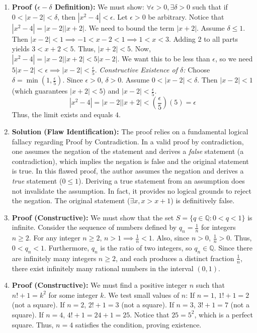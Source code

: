 \documentclass[11pt]{article}
\begin{document}
\begin{enumerate}
    \item \textbf{Proof ($\epsilon-\delta$ Definition):} We must show: $\forall \epsilon > 0, \exists \delta > 0$ such that if $0 < |x - 2| < \delta$, then $|x^2 - 4| < \epsilon$.
    Let $\epsilon > 0$ be arbitrary. Notice that $|x^2 - 4| = |x - 2||x + 2|$. We need to bound the term $|x + 2|$. 
    Assume $\delta \le 1$. Then $|x - 2| < 1 \implies -1 < x - 2 < 1 \implies 1 < x < 3$. 
    Adding $2$ to all parts yields $3 < x + 2 < 5$. Thus, $|x + 2| < 5$.
    Now, $|x^2 - 4| = |x - 2||x + 2| < 5|x - 2|$. We want this to be less than $\epsilon$, so we need $5|x - 2| < \epsilon \implies |x - 2| < \frac{\epsilon}{5}$.
    \textit{Constructive Existence of $\delta$:} Choose $\delta = \min(1, \frac{\epsilon}{5})$. Since $\epsilon > 0$, $\delta > 0$.
    Assume $0 < |x - 2| < \delta$. Then $|x - 2| < 1$ (which guarantees $|x + 2| < 5$) and $|x - 2| < \frac{\epsilon}{5}$.
    \[ |x^2 - 4| = |x - 2||x + 2| < \left(\frac{\epsilon}{5}\right)(5) = \epsilon \]
    Thus, the limit exists and equals $4$. \qedhere

    \item \textbf{Solution (Flaw Identification):} The proof relies on a fundamental logical fallacy regarding Proof by Contradiction. In a valid proof by contradiction, one assumes the negation of the statement and derives a \textit{false} statement (a contradiction), which implies the negation is false and the original statement is true. 
    In this flawed proof, the author assumes the negation and derives a \textit{true} statement ($0 \le 1$). Deriving a true statement from an assumption does not invalidate the assumption. In fact, it provides no logical grounds to reject the negation. The original statement ($\exists x, x > x+1$) is definitively false. \qedhere

    \item \textbf{Proof (Constructive):} We must show that the set $S = \{q \in \mathbb{Q} : 0 < q < 1\}$ is infinite. 
    Consider the sequence of numbers defined by $q_n = \frac{1}{n}$ for integers $n \ge 2$. 
    For any integer $n \ge 2$, $n > 1 \implies \frac{1}{n} < 1$. Also, since $n > 0$, $\frac{1}{n} > 0$. Thus, $0 < q_n < 1$.
    Furthermore, $q_n$ is the ratio of two integers, so $q_n \in \mathbb{Q}$. 
    Since there are infinitely many integers $n \ge 2$, and each produces a distinct fraction $\frac{1}{n}$, there exist infinitely many rational numbers in the interval $(0, 1)$. \qedhere

    \item \textbf{Proof (Constructive):} We must find a positive integer $n$ such that $n! + 1 = k^2$ for some integer $k$. We test small values of $n$:
    If $n = 1$, $1! + 1 = 2$ (not a square).
    If $n = 2$, $2! + 1 = 3$ (not a square).
    If $n = 3$, $3! + 1 = 7$ (not a square).
    If $n = 4$, $4! + 1 = 24 + 1 = 25$. 
    Notice that $25 = 5^2$, which is a perfect square. Thus, $n = 4$ satisfies the condition, proving existence. \qedhere


\end{enumerate}
\end{document}
